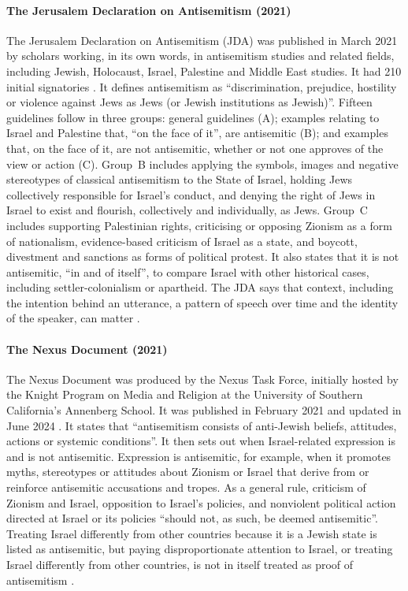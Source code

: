 \paragraph{The Jerusalem Declaration on Antisemitism (2021)}
The Jerusalem Declaration on Antisemitism (JDA) was published in March 2021 by scholars working, in its own words, in antisemitism studies and related fields, including Jewish, Holocaust, Israel, Palestine and Middle East studies. It had 210 initial signatories \citep{jda2021}. It defines antisemitism as ``discrimination, prejudice, hostility or violence against Jews as Jews (or Jewish institutions as Jewish)''. Fifteen guidelines follow in three groups: general guidelines (A); examples relating to Israel and Palestine that, ``on the face of it'', are antisemitic (B); and examples that, on the face of it, are not antisemitic, whether or not one approves of the view or action (C). Group~B includes applying the symbols, images and negative stereotypes of classical antisemitism to the State of Israel, holding Jews collectively responsible for Israel's conduct, and denying the right of Jews in Israel to exist and flourish, collectively and individually, as Jews. Group~C includes supporting Palestinian rights, criticising or opposing Zionism as a form of nationalism, evidence-based criticism of Israel as a state, and boycott, divestment and sanctions as forms of political protest. It also states that it is not antisemitic, ``in and of itself'', to compare Israel with other historical cases, including settler-colonialism or apartheid. The JDA says that context, including the intention behind an utterance, a pattern of speech over time and the identity of the speaker, can matter \citep{jda2021}.

\paragraph{The Nexus Document (2021)}
The Nexus Document was produced by the Nexus Task Force, initially hosted by the Knight Program on Media and Religion at the University of Southern California's Annenberg School. It was published in February 2021 and updated in June 2024 \citep{nexus2021}. It states that ``antisemitism consists of anti-Jewish beliefs, attitudes, actions or systemic conditions''. It then sets out when Israel-related expression is and is not antisemitic. Expression is antisemitic, for example, when it promotes myths, stereotypes or attitudes about Zionism or Israel that derive from or reinforce antisemitic accusations and tropes. As a general rule, criticism of Zionism and Israel, opposition to Israel's policies, and nonviolent political action directed at Israel or its policies ``should not, as such, be deemed antisemitic''. Treating Israel differently from other countries because it is a Jewish state is listed as antisemitic, but paying disproportionate attention to Israel, or treating Israel differently from other countries, is not in itself treated as proof of antisemitism \citep{nexus2021}.

